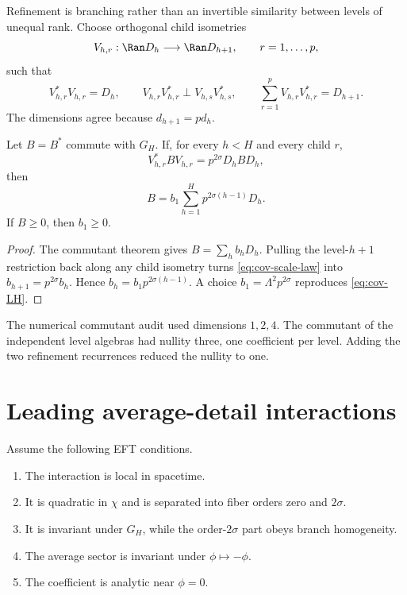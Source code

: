 Refinement is branching rather than an invertible similarity between levels of unequal rank.  Choose orthogonal child isometries
\begin{equation}
V_{h,r}:\Ran D_h\longrightarrow\Ran D_{h+1},
\qquad r=1,\ldots,p,
\label{eq:cov-branching}
\end{equation}
such that
\begin{equation}
V_{h,r}^{*}V_{h,r}=D_h,
\qquad
V_{h,r}V_{h,r}^{*}\perp V_{h,s}V_{h,s}^{*},
\qquad
\sum_{r=1}^{p}V_{h,r}V_{h,r}^{*}=D_{h+1}.
\label{eq:cov-branching-resolution}
\end{equation}
The dimensions agree because $d_{h+1}=pd_h$.

\begin{theorem}
Let $B=B^*$ commute with $G_H$.  If, for every $h<H$ and every child $r$,
\begin{equation}
V_{h,r}^{*}BV_{h,r}
=p^{2\sigma}D_hBD_h,
\label{eq:cov-scale-law}
\end{equation}
then
\begin{equation}
B=b_1\sum_{h=1}^{H}p^{2\sigma(h-1)}D_h.
\label{eq:cov-branch-solution}
\end{equation}
If $B\ge0$, then $b_1\ge0$.
\end{theorem}

\begin{proof}
The commutant theorem gives $B=\sum_hb_hD_h$.  Pulling the level-$h+1$ restriction back along any child isometry turns \eqref{eq:cov-scale-law} into $b_{h+1}=p^{2\sigma}b_h$.  Hence $b_h=b_1p^{2\sigma(h-1)}$.  A choice $b_1=\Lambda^2p^{2\sigma}$ reproduces \eqref{eq:cov-LH}.
\end{proof}

The numerical commutant audit used dimensions $1,2,4$.  The commutant of the independent level algebras had nullity three, one coefficient per level.  Adding the two refinement recurrences reduced the nullity to one.

\section{Leading average-detail interactions}

Assume the following EFT conditions.
\begin{enumerate}[leftmargin=2.2em]
\item The interaction is local in spacetime.
\item It is quadratic in $\chi$ and is separated into fiber orders zero and $2\sigma$.
\item It is invariant under $G_H$, while the order-$2\sigma$ part obeys branch homogeneity.
\item The average sector is invariant under $\phi\mapsto-\phi$.
\item The coefficient is analytic near $\phi=0$.
\end{enumerate}

